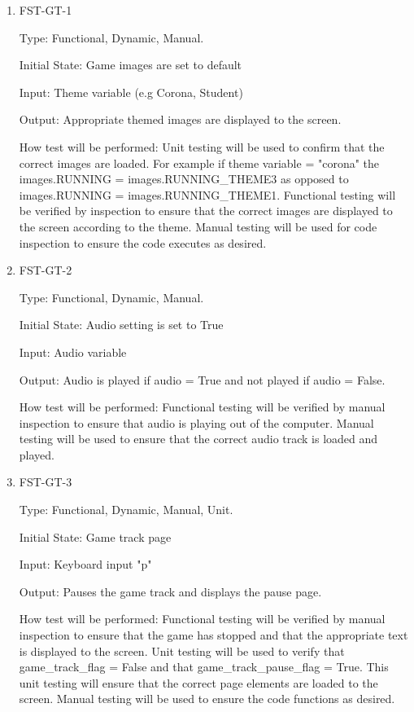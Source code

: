 \documentclass[12pt, titlepage]{article}
\begin{document}
	\begin{enumerate}
		
		\item{FST-GT-1\\}
		
		Type: Functional, Dynamic, Manual.
		
		Initial State: Game images are set to default 
		
		Input: Theme variable (e.g Corona, Student)
		
		Output: Appropriate themed images are displayed to the screen.
		
		How test will be performed: Unit testing will be used to confirm that the correct images are loaded. For example if theme variable = "corona" the images.RUNNING = images.RUNNING\_THEME3 as opposed to images.RUNNING = images.RUNNING\_THEME1. Functional testing will be verified by inspection to ensure that the correct images are displayed to the screen according to the theme. Manual testing will be used for code inspection to ensure the code executes as desired. 
		
		\item{FST-GT-2\\}
		
		Type: Functional, Dynamic, Manual.
		
		Initial State: Audio setting is set to True 
		
		Input: Audio variable 
		
		Output: Audio is played if audio = True and not played if audio = False. 
		
		How test will be performed: Functional testing will be verified by manual inspection to ensure that audio is playing out of the computer. Manual testing will be used to ensure that the correct audio track is loaded and played. 
		
		\item{FST-GT-3\\}
		
		Type: Functional, Dynamic, Manual, Unit.
		
		Initial State: Game track page 
		
		Input: Keyboard input "p" 
		
		Output: Pauses the game track and displays the pause page. 
		
		How test will be performed: Functional testing will be verified by manual inspection to ensure that the game has stopped and that the appropriate text is displayed to the screen. Unit testing will be used to verify that game\_track\_flag = False and that game\_track\_pause\_flag = True. This unit testing will ensure that the correct page elements are loaded to the screen. Manual testing will be used to ensure the code functions as desired. 
		

\end{enumerate}
\end{document}
